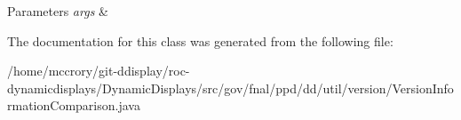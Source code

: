 \begin{DoxyParams}{Parameters}
{\em args} & \\
\hline
\end{DoxyParams}


The documentation for this class was generated from the following file\-:\begin{DoxyCompactItemize}
\item 
/home/mccrory/git-\/ddisplay/roc-\/dynamicdisplays/\-Dynamic\-Displays/src/gov/fnal/ppd/dd/util/version/Version\-Information\-Comparison.\-java\end{DoxyCompactItemize}

